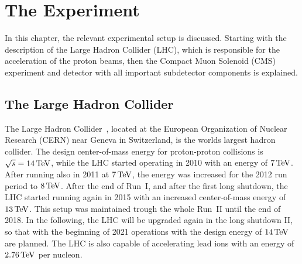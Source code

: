 \chapter{The Experiment}\label{chap:experiment}
In this chapter, the relevant experimental setup is discussed. Starting with the description of the Large Hadron Collider (LHC), which is responsible for the acceleration of the proton beams, then the Compact Muon Solenoid (CMS) experiment and detector with all important subdetector components is explained.
\section{The Large Hadron Collider}\label{sec:LHC}
The Large Hadron Collider~\cite{LHC1,LHC2}, located at the European Organization of Nuclear Research (CERN) near Geneva in Switzerland, is the worlds largest hadron collider. The design center-of-mass energy for proton-proton collisions is $\sqrt{s}=14\,\text{Te\hspace{-.08em}V}$, while the LHC started operating in 2010 with an energy of $7\,\text{Te\hspace{-.08em}V}$. After running also in 2011 at $7\,\text{Te\hspace{-.08em}V}$, the energy was increased for the 2012 run period to $8\,\text{Te\hspace{-.08em}V}$. After the end of Run~I, and after the first long shutdown, the LHC started running again in 2015 with an increased center-of-mass energy of $13\,\text{Te\hspace{-.08em}V}$. This setup was maintained trough the whole Run~II until the end of 2018. In the following, the LHC will be upgraded again in the long shutdown II, so that with the beginning of 2021 operations with the design energy of $14\,\text{Te\hspace{-.08em}V}$ are planned.
The LHC is also capable of accelerating lead ions with an energy of $2.76\,\text{Te\hspace{-.08em}V}$ per nucleon.\\
